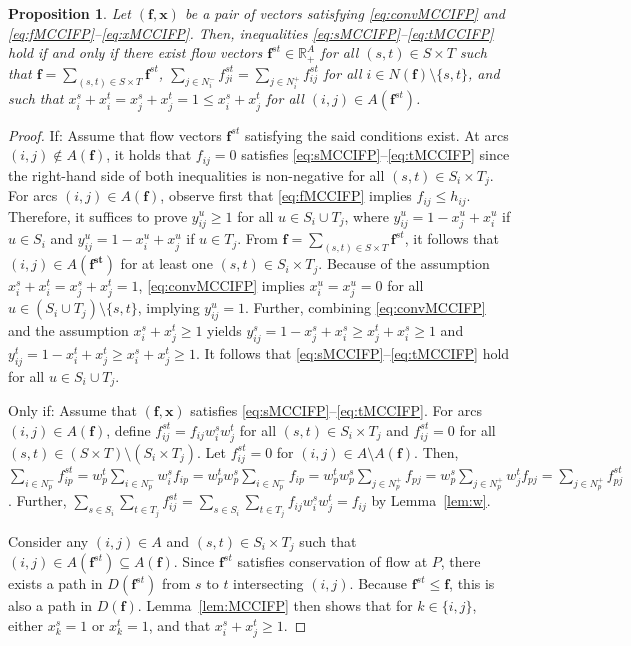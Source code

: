\documentclass[pdflatex,sn-mathphys-num]{sn-jnl}%
\theoremstyle{thmstyleone}%
\newtheorem{proposition}[theorem]{Proposition}%
\begin{document}
\begin{proposition} \label{prop:multi}
Let $(\boldsymbol{f},\boldsymbol{x})$ be a pair of vectors satisfying \eqref{eq:convMCCIFP} and \eqref{eq:fMCCIFP}--\eqref{eq:xMCCIFP}.
Then, inequalities \eqref{eq:sMCCIFP}--\eqref{eq:tMCCIFP} hold if and only if there exist flow vectors
$\boldsymbol{f}^{st}\in\mathbb{R}_+^A$ for all $(s,t)\in S\times T$ such that $\boldsymbol{f} = \sum_{(s,t)\in S\times T}\boldsymbol{f}^{st}$,
$\sum_{j\in N_i^-}f_{ji}^{st} = \sum_{j\in N_i^+}f_{ij}^{st}$ for all $i\in N(\boldsymbol{f})\setminus\{s,t\}$, and such that
$x_i^s+x_i^t=x_j^s+x_j^t=1\leq x_i^s+x_j^t$ for all $(i,j)\in A(\boldsymbol{f}^{st})$.
\end{proposition}
\begin{proof}
If: Assume that flow vectors $\boldsymbol{f}^{st}$ satisfying the said conditions exist. %
At arcs $(i,j)\notin A(\boldsymbol{f})$, it holds that $f_{ij}=0$ satisfies \eqref{eq:sMCCIFP}--\eqref{eq:tMCCIFP} since the right-hand side of both inequalities is non-negative for all $(s,t)\in S_i\times T_j$.
For arcs $(i,j)\in A(\boldsymbol{f})$, observe first that \eqref{eq:fMCCIFP} implies $f_{ij}\leq h_{ij}$.
Therefore, it suffices to prove $y_{ij}^u\geq 1$ for all $u\in S_i\cup T_j$, where $y_{ij}^u=1-x_j^u+x_i^u$ if $u\in S_i$ and $y_{ij}^u=1-x_i^u+x_j^u$ if $u\in T_j$.
From $\boldsymbol{f} = \sum_{(s,t)\in S\times T}\boldsymbol{f}^{st}$, it follows that $(i,j)\in A(\boldsymbol{f^{st}})$ for at least one $(s,t)\in S_i\times T_j$.
Because of the assumption $x_i^s+x_i^t=x_j^s+x_j^t=1$, \eqref{eq:convMCCIFP} implies $x_i^u=x_j^u=0$ for all $u\in(S_i\cup T_j)\setminus\{s,t\}$, implying $y_{ij}^u=1$.
Further, combining \eqref{eq:convMCCIFP} and the assumption $x_i^s+x_j^t\geq 1$ yields $y_{ij}^s=1-x_j^s+x_i^s\geq x_j^t+x_i^s\geq 1$ and $y_{ij}^t=1-x_i^t+x_j^t\geq x_i^s+x_j^t\geq 1$. 
It follows that \eqref{eq:sMCCIFP}--\eqref{eq:tMCCIFP} hold for all $u\in S_i\cup T_j$.

Only if: 
Assume that $(\boldsymbol{f},\boldsymbol{x})$ satisfies \eqref{eq:sMCCIFP}--\eqref{eq:tMCCIFP}.
For arcs $(i,j)\in A(\boldsymbol{f})$, define $f_{ij}^{st} = f_{ij}w_i^sw_j^t$ for all $(s,t)\in S_i\times T_j$ and $f_{ij}^{st}=0$ for all $(s,t)\in(S\times T)\setminus(S_i\times T_j)$.
Let $f_{ij}^{st}=0$ for $(i,j)\in A\setminus A(\boldsymbol{f})$.
Then, $\sum_{i\in N_p^-}f_{ip}^{st} = w_p^t\sum_{i\in N_p^-}w_i^sf_{ip} = w_p^tw_p^s\sum_{i\in N_p^-}f_{ip} = w_p^tw_p^s\sum_{j\in N_p^+}f_{pj} = w_p^s\sum_{j\in N_p^+}w_j^tf_{pj} = \sum_{j\in N_p^+}f_{pj}^{st}$.
Further, $\sum_{s\in S_i}\sum_{t\in T_j}f_{ij}^{st}=\sum_{s\in S_i}\sum_{t\in T_j}f_{ij}w_i^sw_j^t=f_{ij}$ by Lemma~\ref{lem:w}.

Consider any $(i,j)\in A$ and $(s,t)\in S_i\times T_j$ such that $(i,j)\in A(\boldsymbol{f}^{st})\subseteq A(\boldsymbol{f})$.
Since $\boldsymbol{f}^{st}$ satisfies conservation of flow at $P$, there exists a path in $D(\boldsymbol{f}^{st})$ from $s$ to $t$ intersecting $(i,j)$.
Because $\boldsymbol{f}^{st}\leq\boldsymbol{f}$, this is also a path in $D(\boldsymbol{f})$.
Lemma~\ref{lem:MCCIFP} then shows that for $k\in\{i,j\}$, either $x_k^s=1$ or $x_k^t=1$,
and that $x_i^s+x_j^t\geq 1$.
\end{proof}
\end{document}

